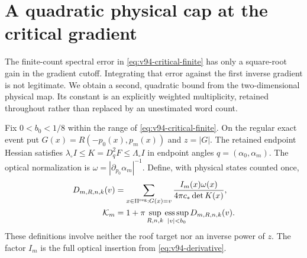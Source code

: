 \section{A quadratic physical cap at the critical gradient}
\label{sec:v98-cap}
The finite-count spectral error in \eqref{eq:v94-critical-finite}
has only a square-root gain in the gradient cutoff. Integrating that
error against the first inverse gradient is not legitimate. We obtain
a second, quadratic bound from the two-dimensional physical map. Its
constant is an explicitly weighted multiplicity, retained throughout
rather than replaced by an unestimated word count.

Fix $0<b_0<1/8$ within the range of \eqref{eq:v94-critical-finite}.
On the regular exact event put $G(x)=R(-p_0(x),p_m(x))$ and $z=|G|$.
The retained endpoint Hessian satisfies
$\lambda_\circ I\le K=D_q^2F\le\Lambda_\circ I$ in endpoint angles
$q=(\alpha_0,\alpha_m)$. The optical normalization is
$\omega=|\partial_{p_0}\alpha_m|^{-1}$.
Define, with physical states counted once,
\begin{align}
 D_{m,R,n,k}(v)
  &=\sum_{x\in\Pi^{\rm reg}:G(x)=v}
       \frac{I_m(x)\omega(x)}{4\pi c_*\det K(x)},\label{eq:v98-gradient-density}\\
 \mathcal K_m
  &=1+\pi\sup_{R,n,k}\operatorname*{ess\,sup}_{|v|<b_0}
                                      D_{m,R,n,k}(v).
                                      \label{eq:v98-weighted-multiplicity}
\end{align}
These definitions involve neither the roof target nor an inverse
power of $z$. The factor $I_m$ is the full optical insertion from
\eqref{eq:v94-derivative}.

